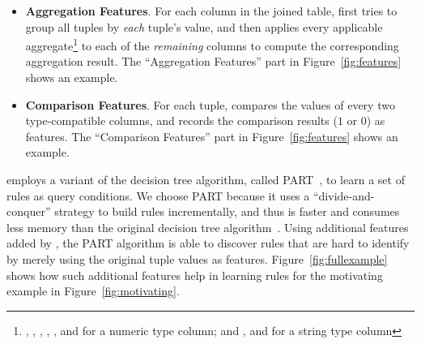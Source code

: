 \begin{itemize}

\item {\textbf{Aggregation Features}}. For each
column in the joined table, \ourtool first tries
to group all tuples by \textit{each} tuple's
value, and then applies every applicable aggregate\footnote{
, , ,
, , and  for a numeric type column;
and , and  for
a string type column} to each of the
 \textit{remaining} columns to compute the corresponding aggregation result. 
The ``Aggregation Features'' part in Figure~\ref{fig:features}
shows an example.

\item {\textbf{Comparison Features}}. For each tuple,
\ourtool compares
the values of every two type-compatible columns, and records
the comparison results ($1$ or $0$) as features.
The ``Comparison Features'' part in Figure~\ref{fig:features}
shows an example.

\end{itemize}



\ourtool employs a variant of the decision tree algorithm,
called PART~\cite{Frank:1998}, to learn a set of rules
as query conditions. We choose PART
because it uses a ``divide-and-conquer'' strategy to 
build rules incrementally, and thus is faster
and consumes less memory than
the original decision tree algorithm~\cite{Quinlan:1986}.
Using additional features added by \ourtool, the
PART algorithm is able to discover rules that are
hard to identify by merely using the original tuple values as features.
Figure~\ref{fig:fullexample} shows how such additional features
help in learning rules for the motivating
example in Figure~\ref{fig:motivating}.




